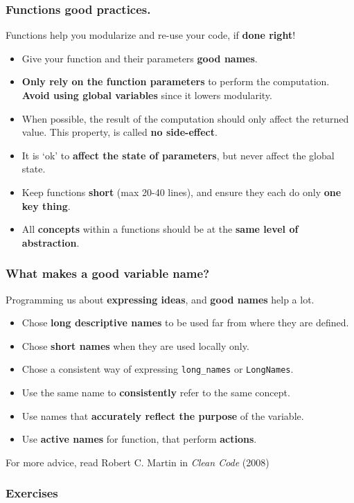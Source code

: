 \documentclass{beamer} %
\newcommand\emc[1]{\textcolor{brightblue}{\textbf{#1}}}
\begin{document}
\begin{frame}
\frametitle{Functions good practices.}

Functions help you modularize and re-use your code, if \emc{done right}!
\begin{itemize}
	\item Give your function and their parameters \emc{good names}.
	\item \emc{Only rely on the function parameters} to perform the computation. \emc{Avoid using global variables} since it lowers modularity.
	\item When possible, the result of the computation should only affect the returned value. This property, is called \emc{no side-effect}.
	\item It is `ok' to \emc{affect the state of parameters}, but never affect the global state.
	\item Keep functions \emc{short} (max 20-40 lines), and ensure they each do only \emc{one key thing}. 
	\item All \emc{concepts} within a functions should be at the \emc{same level of abstraction}.
\end{itemize}

\end{frame}

\begin{frame}
\frametitle{What makes a good variable name?}

Programming us about \emc{expressing ideas}, and \emc{good names} help a lot.

\begin{itemize}
	\item Chose \emc{long descriptive names} to be used far from where they are defined.
	\item Chose \emc{short names} when they are used locally only.
	\item Chose a consistent way of expressing \texttt{long\_names} or \texttt{LongNames}.
	\item Use the same name to \emc{consistently} refer to the same concept.
	\item Use names that \emc{accurately reflect the purpose} of the variable.
	\item Use \emc{active names} for function, that perform \emc{actions}.
\end{itemize}

For more advice, read Robert C. Martin in \emph{Clean Code} (2008)

\end{frame}


\begin{frame}
\frametitle{Exercises}

\end{frame}




\end{document}
